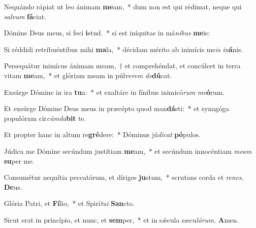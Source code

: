 \item Nequándo rápiat ut leo ánimam \textbf{me}am,~* dum non est qui rédimat, neque qui \textit{salvum} \textbf{fá}ciat.
\item Dómine Deus meus, si feci \textbf{i}stud.~* si est iníquitas in má\textit{nibus} \textbf{me}is:
\item Si réddidi retribuéntibus mihi \textbf{ma}la,~* décidam mérito ab inimícis me\textit{is} \textit{in}\textbf{á}nis.
\item Persequátur inimícus ánimam meam,~† et comprehéndat, et concúlcet in terra vitam \textbf{me}am,~* et glóriam meam in púlve\hspace{0.03em}\textit{rem} \textit{de}\textbf{dú}cat.
\item Exsúrge Dómine in ira \textbf{tu}a:~* et exaltáre in fínibus inimicó\textit{rum} \textit{me}\textbf{ó}rum.
\item Et exsúrge Dómine Deus meus in præcépto quod man\textbf{dá}sti:~* et synagóga populórum cir\textit{cúmda}\textbf{bit} te.
\item Et propter hanc in altum re\textbf{gré}dere:~* Dóminus jú\hspace{0.03em}\textit{dicat} \textbf{pó}pulos.
\item Júdica me Dómine secúndum justítiam \textbf{me}am,~* et secúndum innocéntiam \textit{meam} \textbf{su}per me.
\item Consumétur nequítia peccatórum, et díriges \textbf{ju}stum,~* scrutans corda et \textit{renes,} \textbf{De}us.
\item Glória Patri, et \textbf{Fí}lio,~* et Spirí\hspace{0.03em}\textit{tui} \textbf{San}cto.
\item Sicut erat in princípio, et nunc, et \textbf{sem}per,~* et in sǽcula sæcu\hspace{0.03em}\textit{lórum.} \textbf{A}men.
